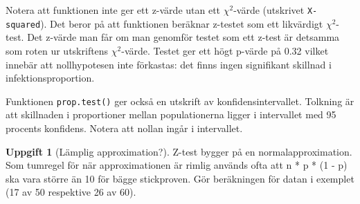 \documentclass[
]{book}
\theoremstyle{definition}
\theoremstyle{definition}
\theoremstyle{definition}
\newtheorem{exercise}{Uppgift}[chapter]
\theoremstyle{definition}
\theoremstyle{remark}
\begin{document}
Notera att funktionen inte ger ett z-värde utan ett \(\chi^2\)-värde (utskrivet \texttt{X-squared}). Det beror på att funktionen beräknar z-testet som ett likvärdigt \(\chi^2\)-test. Det z-värde man får om man genomför testet som ett z-test är detsamma som roten ur utskriftens \(\chi^2\)-värde. Testet ger ett högt p-värde på 0.32 vilket innebär att nollhypotesen inte förkastas: det finns ingen signifikant skillnad i infektionsproportion.

Funktionen \texttt{prop.test()} ger också en utskrift av konfidensintervallet. Tolkning är att skillnaden i proportioner mellan populationerna ligger i intervallet med 95 procents konfidens. Notera att nollan ingår i intervallet.

\begin{exercise}[Lämplig approximation?]
Z-test bygger på en normalapproximation. Som tumregel för när approximationen är rimlig används ofta att n * p * (1 - p) ska vara större än 10 för bägge stickproven. Gör beräkningen för datan i exemplet (17 av 50 respektive 26 av 60).
\end{exercise}
\end{document}
